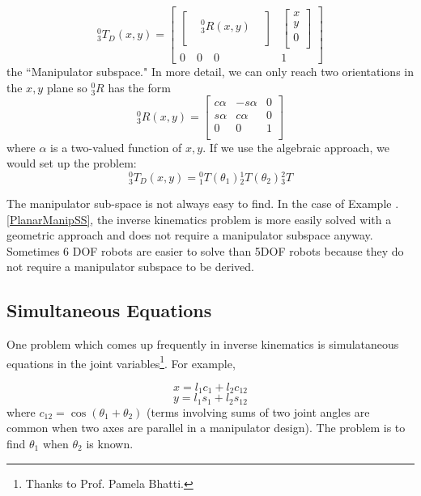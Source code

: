 \begin{ExampleSmall}
\[
^0_3T_D(x,y) =
\begin{bmatrix}
\begin{bmatrix}  &  &  \\  & ^0_3R(x,y) &   \\ & & \\ \end{bmatrix}      &
 \begin{bmatrix} x \\ y \\  0  \\ \end{bmatrix}            \\
 0 \quad 0 \quad 0      &   1
\end{bmatrix}
\]
the ``Manipulator subspace."  In more detail, we can only reach two orientations in the $x,y$ plane so $^0_3R$ has the form
\[
{^0_3R}(x,y) =
   \begin{bmatrix}
          c\alpha	&   -s\alpha	&   0	\\
	  s\alpha	&    c\alpha	&   0	\\
	     0 		&     	0	&   1   \\
   \end{bmatrix}
\]
where $\alpha$ is a two-valued function of $x,y$.
If we use the algebraic approach, we would set up the problem:
\[
^0_3T_D(x,y) = {^0_1T}(\theta_1){^1_2T}(\theta_2){^2_3T}
\]
\end{ExampleSmall}

The manipulator sub-space is not always easy to find.  In the case of Example \thechapter.\ref{PlanarManipSS}, the inverse kinematics problem is more easily solved with a geometric approach and does not require a manipulator subspace anyway.  Sometimes 6 DOF robots are easier to solve than 5DOF robots because they do not require a manipulator subspace to be derived.





\subsection{Simultaneous Equations}

One problem which comes up frequently in inverse kinematics is simulataneous equations in the joint variables\footnote{Thanks to Prof. Pamela Bhatti.}.   For example,

\[
x = l_1c_1 + l_2c_{12}
\]
\[
y = l_1s_1 + l_2s_{12}
\]
where $c_{12} = \cos(\theta_1+\theta_2)$ (terms involving sums of two joint angles are common when two axes are parallel in a manipulator design).  The problem is to find $\theta_1$ when $\theta_2$ is known.

